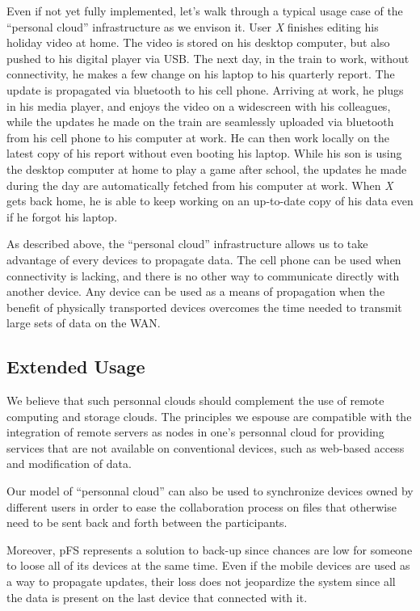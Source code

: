 Even if not yet fully implemented, let's walk through a typical usage
case of the ``personal cloud'' infrastructure as we envison it. User
\emph{X} finishes editing his holiday video at home. The video is
stored on his desktop computer, but also pushed to his digital player
via USB. The next day, in the train to work, without connectivity, he
makes a few change on his laptop to his quarterly report. The update
is propagated via bluetooth to his cell phone. Arriving at work, he
plugs in his media player, and enjoys the video on a widescreen with
his colleagues, while the updates he made on the train are seamlessly
uploaded via bluetooth from his cell phone to his computer at work. He
can then work locally on the latest copy of his report without even
booting his laptop. While his son is using the desktop computer at
home to play a game after school, the updates he made during the day
are automatically fetched from his computer at work. When \emph{X}
gets back home, he is able to keep working on an up-to-date copy of
his data even if he forgot his laptop.

As described above, the ``personal cloud'' infrastructure allows us to
take advantage of every devices to propagate data. The cell phone can
be used when connectivity is lacking, and there is no other way to
communicate directly with another device. Any device can be used as a
means of propagation when the benefit of physically transported devices
overcomes the time needed to transmit large sets of data on the WAN.

\subsection{Extended Usage}

We believe that such personnal clouds should complement the use of
remote computing and storage clouds. The principles we espouse are
compatible with the integration of remote servers as nodes in one's
personnal cloud for providing services that are not available on
conventional devices, such as web-based access and modification of
data.

Our model of ``personnal cloud'' can also be used to synchronize
devices owned by different users in order to ease the collaboration
process on files that otherwise need to be sent back and forth between
the participants.

Moreover, pFS represents a solution to back-up since chances are low
for someone to loose all of its devices at the same time. Even if the
mobile devices are used as a way to propagate updates, their loss does not
jeopardize the system since all the data is present on the last device
that connected with it.

